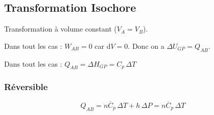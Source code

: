 \documentclass[a4paper,12pt]{article}
\newcommand{\diff}{\mathrm{d}} %
\newcommand{\Cp}{\overline{C}_p} %
\begin{document}
    \subsection{Transformation Isochore}

        Transformation à volume constant ($V_A=V_B$).

        Dans tout les cas : $ W_{AB} = 0 $ car $ \diff V = 0 $. Donc on a $ \Delta U_{GP} = Q_{AB} $.
        
        Dans tout les cas : $Q_{AB} = \Delta H_{GP} = C_p \, \Delta T $
                
        \subsubsection{Réversible}

             $$ Q_{AB} = n \Cp \, \Delta T + h \, \Delta P = n \Cp \, \Delta T $$
\end{document}
